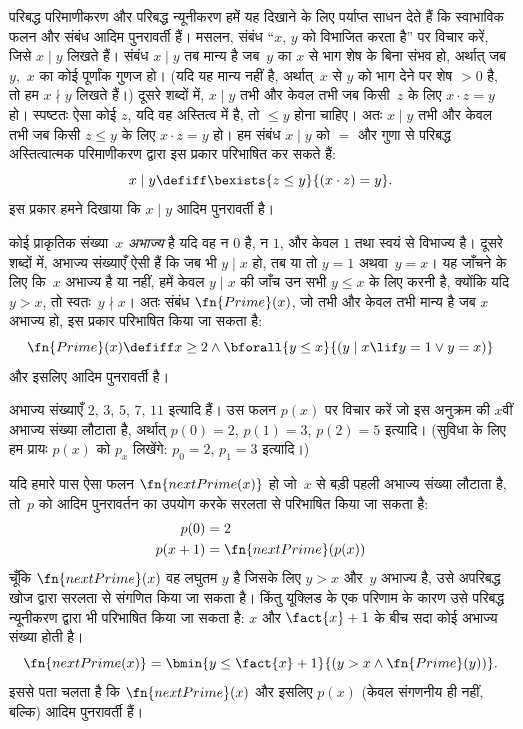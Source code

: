\documentclass[../../../include/open-logic-section]{subfiles}
\begin{document}

परिबद्ध परिमाणीकरण और परिबद्ध न्यूनीकरण हमें यह दिखाने के लिए पर्याप्त
साधन देते हैं कि स्वाभाविक फलन और संबंध आदिम पुनरावर्ती हैं। मसलन,
संबंध ``$x$, $y$ को विभाजित करता है'' पर विचार करें, जिसे $x \mid y$
लिखते हैं। संबंध $x \mid y$ तब मान्य है जब~$y$ का $x$ से भाग शेष के
बिना संभव हो, अर्थात् जब $y$,~$x$ का कोई पूर्णांक गुणज हो। (यदि यह
मान्य नहीं है, अर्थात्~$x$ से $y$ को भाग देने पर शेष $> 0$ है, तो हम
$x \nmid y$ लिखते हैं।) दूसरे शब्दों में, $x \mid y$ तभी और केवल तभी
जब किसी~$z$ के लिए $x \cdot z = y$ हो। स्पष्टतः ऐसा कोई $z$, यदि वह
अस्तित्व में है, तो $\leq y$ होना चाहिए। अतः $x \mid y$ तभी और केवल
तभी जब किसी $z \le y$ के लिए $x \cdot z = y$ हो। हम संबंध $x \mid y$
को $=$ और गुणा से परिबद्ध अस्तित्वात्मक परिमाणीकरण द्वारा इस प्रकार
परिभाषित कर सकते हैं:
\[
x \mid y \defiff \bexists{z \leq y}{(x \cdot z) = y}.
\]
इस प्रकार हमने दिखाया कि $x \mid y$ आदिम पुनरावर्ती है।

कोई प्राकृतिक संख्या~$x$ \emph{अभाज्य} है यदि वह न $0$ है, न $1$, और
केवल $1$ तथा स्वयं से विभाज्य है। दूसरे शब्दों में, अभाज्य संख्याएँ ऐसी
हैं कि जब भी $y \mid x$ हो, तब या तो $y = 1$ अथवा~$y=x$। यह जाँचने के
लिए कि~$x$ अभाज्य है या नहीं, हमें केवल $y \mid x$ की जाँच उन सभी
$y \le x$ के लिए करनी है, क्योंकि यदि $y > x$, तो स्वतः~$y \nmid x$। अतः संबंध
$\fn{Prime}(x)$, जो तभी और केवल तभी मान्य है जब $x$ अभाज्य हो, इस प्रकार
परिभाषित किया जा सकता है:
\[
\fn{Prime}(x) \defiff x \geq 2 \land \bforall{y \leq x}{(y \mid x \lif y
  = 1 \lor y = x)}
\]
और इसलिए आदिम पुनरावर्ती है।

अभाज्य संख्याएँ $2$, $3$, $5$, $7$, $11$ इत्यादि हैं। उस फलन $p(x)$
पर विचार करें जो इस अनुक्रम की $x$वीं अभाज्य संख्या लौटाता है, अर्थात्
$p(0) =
2$, $p(1) = 3$, $p(2) = 5$ इत्यादि। (सुविधा के लिए हम प्रायः
$p(x)$ को $p_x$ लिखेंगे: $p_0=2$, $p_1=3$ इत्यादि।)

यदि हमारे पास ऐसा फलन $\fn{nextPrime(x)}$ हो जो~$x$ से बड़ी पहली
अभाज्य संख्या लौटाता है, तो~$p$ को आदिम पुनरावर्तन का उपयोग करके सरलता
से परिभाषित किया जा सकता है:
\begin{align*}
  p(0) & = 2\\
  p(x+1) & = \fn{nextPrime}(p(x))
\end{align*}
चूँकि $\fn{nextPrime}(x)$ वह लघुतम $y$ है जिसके लिए $y > x$ और~$y$
अभाज्य है, उसे अपरिबद्ध खोज द्वारा सरलता से संगणित किया जा सकता है। किंतु
यूक्लिड के एक परिणाम के कारण उसे परिबद्ध न्यूनीकरण द्वारा भी परिभाषित
किया जा सकता है: $x$ और $\fact{x}+1$ के बीच सदा कोई अभाज्य संख्या होती है।
\[
  \fn{nextPrime(x)} =
  \bmin{y \leq \fact{x}+1}{(y > x \land \fn{Prime}(y))}.
\]
इससे पता चलता है कि $\fn{nextPrime}(x)$ और इसलिए $p(x)$ (केवल संगणनीय
ही नहीं, बल्कि) आदिम पुनरावर्ती हैं।
\end{document}
